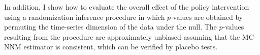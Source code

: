 \documentclass[hidelinks,12pt]{article}
\begin{document}
In addition, I show how to evaluate the overall effect of the policy intervention using a randomization inference procedure in which $p$-values are obtained by permuting the time-series dimension of the data under the null. The $p$-values resulting from the procedure are approximately unbiased assuming that the MC-NNM estimator is consistent, which can be verified by placebo tests. 

\newpage


\begin{singlespace}
\begin{multicols}{2}

\end{multicols}
\end{singlespace}

\itemize
\end{document}
